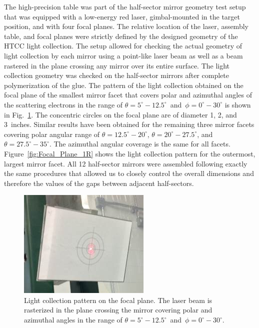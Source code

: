 The high-precision table was part of the half-sector mirror geometry test setup that was equipped with a
low-energy red laser, gimbal-mounted in the target position, and with four focal planes. The relative location of the
laser, assembly table, and focal planes were strictly defined by the designed geometry of the HTCC light collection.
The setup allowed for checking the actual geometry of light collection by each mirror using a point-like laser beam
as well as a beam rastered in the plane crossing any mirror over its entire surface. The light collection geometry
was checked on the half-sector mirrors after complete polymerization of the glue. The pattern of the light collection obtained on the focal plane of the smallest mirror facet that covers polar and azimuthal angles of
the scattering electrons in the range of $\theta = 5^\circ - 12.5^\circ$\, and\, $\phi = 0^\circ - 30^\circ$ is shown in
Fig.~\ref{fig:Focal_Plane_4}. The concentric circles on the focal plane are of diameter 1, 2, and 3~inches. Similar
results have been obtained for the remaining three mirror facets covering polar angular range of
$\theta = 12.5^\circ - 20^\circ$, $\theta = 20^\circ - 27.5^\circ$, and $\theta = 27.5^\circ - 35^\circ$. The
azimuthal angular coverage is the same for all facets. Figure~\ref{fig:Focal_Plane_1R} shows the light collection
pattern for the outermost, largest mirror facet. All 12 half-sector mirrors were assembled following exactly
the same procedures that allowed us to closely control the overall dimensions and therefore the values of the gaps
between adjacent half-sectors. 

\begin{figure}[ht]
    \centering
    \includegraphics[width=0.90\linewidth]{images/Focal_Plane_4.jpg}
    \caption{Light collection pattern on the focal plane. The laser beam is rasterized in the plane crossing the mirror
      covering polar and azimuthal angles in the range of $\theta = 5^\circ - 12.5^\circ$\, and\,
      $\phi = 0^\circ - 30^\circ$.}
    \label{fig:Focal_Plane_4}
\end{figure}


